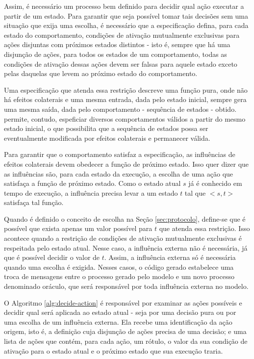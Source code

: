 Assim, é necessário um processo bem definido para decidir qual ação executar a
partir de um estado. Para garantir que seja possível tomar tais decisões sem uma
situação que exija uma escolha, é
necessário que a especificação defina, para cada estado do comportamento, condições de ativação mutualmente
exclusivas para ações disjuntas com próximos estados distintos - isto é,
sempre que há uma disjunção de ações, para todos os estados de um comportamento,
todas as condições de ativação dessas ações devem ser falsas para aquele estado exceto pelas daquelas
que levem ao próximo estado do comportamento.

Uma especificação que atenda essa restrição descreve uma função pura, onde não
há efeitos colaterais e uma mesma entrada, dada pelo estado inicial, sempre gera uma mesma
saída, dada pelo comportamento - sequência de estados - obtido. \TLA permite,
contudo, espeficiar diversos comportamentos válidos a partir do mesmo estado
inicial, o que possibilita que a sequência de estados possa ser eventualmente modificada por
efeitos colaterais e permanecer válida.

Para garantir que o comportamento satisfaz a especificação, as influências de
efeitos colaterais devem obedecer a função de próximo estado. Isso quer dizer
que as influências são, para cada estado da execução, a escolha de uma ação que
satisfaça a função de próximo estado. Como o estado atual $s$ já é conhecido em
tempo de execução, a influência precisa levar a um estado $t$ tal que $<s,t>$
satisfaça tal função.

Quando é definido o conceito de escolha na Seção \ref{sec:protocolo}, define-se que é possível
que exista apenas um valor possível para $t$ que atenda essa restrição. Isso acontece quando a restrição
de condições de ativação mutualmente exclusivas é respeitada pelo estado atual.
Nesse caso, a influência externa não é necessária, já que é possível decidir o
valor de $t$. Assim, a influência externa só é necessária quando uma escolha é
exigida. Nesses casos, o código gerado estabelece uma troca de mensagens entre o
processo gerado pelo modelo e um novo processo denominado oráculo, que será
responsável por toda influência externa no modelo.

O Algoritmo \ref{alg:decide-action} é responsável por examinar as ações
possíveis e decidir qual será aplicada ao estado atual - seja por uma decisão
pura ou por uma escolha de um influência externa. Ela recebe uma identificação
da ação origem, isto é, a definição cuja disjunção de ações precisa de uma
decisão; e uma lista de ações que contém, para cada ação, um rótulo, o valor da
sua condição de ativação para o estado atual e o próximo estado que sua execução traria.

